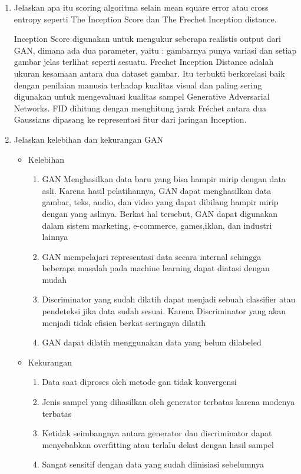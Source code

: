 \begin{enumerate}
            \item Jelaskan apa itu scoring algoritma selain mean square error atau cross entropy seperti The Inception Score dan The Frechet Inception distance.
            \par Inception Score digunakan untuk mengukur seberapa realistis output dari GAN, dimana ada dua parameter, yaitu : gambarnya punya variasi dan setiap gambar jelas terlihat seperti sesuatu. Frechet Inception Distance adalah ukuran kesamaan antara dua dataset gambar. Itu terbukti berkorelasi baik dengan penilaian manusia terhadap kualitas visual dan paling sering digunakan untuk mengevaluasi kualitas sampel Generative Adversarial Networks. FID dihitung dengan menghitung jarak Fréchet antara dua Gaussians dipasang ke representasi fitur dari jaringan Inception.
            
            \item Jelaskan kelebihan dan kekurangan GAN
            \begin{itemize}
              \item Kelebihan 
            \begin{enumerate}
               
                \item GAN Menghasilkan data baru yang bisa hampir mirip dengan data asli. Karena hasil pelatihannya, GAN dapat menghasilkan data gambar, teks, audio, dan video yang dapat dibilang hampir mirip dengan yang aslinya. Berkat hal tersebut, GAN dapat digunakan dalam sistem marketing, e-commerce, games,iklan, dan industri lainnya
                \item GAN mempelajari representasi data secara internal sehingga beberapa masalah pada machine learning dapat diatasi dengan mudah
                \item Discriminator yang sudah dilatih dapat menjadi sebuah classifier atau pendeteksi jika data sudah sesuai. Karena Discriminator yang akan menjadi tidak efisien berkat seringnya dilatih
                \item GAN dapat dilatih menggunakan data yang belum dilabeled
              
            \end{enumerate}
              \item Kekurangan
                \begin{enumerate}  
                    \item Data saat diproses oleh metode gan tidak konvergensi
                    \item Jenis sampel yang dihasilkan oleh generator terbatas karena modenya terbatas
                    \item Ketidak seimbangnya antara generator dan discriminator dapat menyebabkan overfitting atau terlalu dekat dengan hasil sampel
                    \item Sangat sensitif dengan data yang sudah diinisiasi sebelumnya
                \end{enumerate}
            \end{itemize}

        \end{enumerate}


